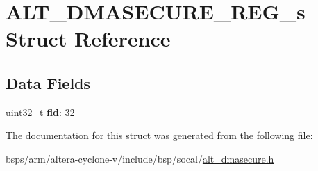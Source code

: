\hypertarget{structALT__DMASECURE__REG__s}{}\section{A\+L\+T\+\_\+\+D\+M\+A\+S\+E\+C\+U\+R\+E\+\_\+\+R\+E\+G\+\_\+s Struct Reference}
\label{structALT__DMASECURE__REG__s}
\subsection*{Data Fields}
\begin{DoxyCompactItemize}
\item 
\mbox{\label{structALT__DMASECURE__REG__s_a477579816073d1a39eedd06b9901903a}} 
uint32\+\_\+t {\bfseries fld}\+: 32
\end{DoxyCompactItemize}


The documentation for this struct was generated from the following file\+:\begin{DoxyCompactItemize}
\item 
bsps/arm/altera-\/cyclone-\/v/include/bsp/socal/\mbox{\hyperlink{alt__dmasecure_8h}{alt\+\_\+dmasecure.\+h}}\end{DoxyCompactItemize}
